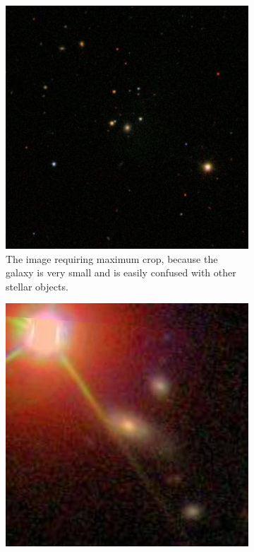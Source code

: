 \documentclass[12pt,a4paper,oneside,oldfontcommands]{memoir}
\begin{document}
\begin{Declaration Of OriginalityOrginality}
\begin{figure}[H]
  \centering
  \begin{subfigure}[b]{0.4\linewidth}
    \includegraphics[width=\linewidth]{images/maximum-256411.jpg}
    \caption{The image requiring maximum crop, because the galaxy is very small and is easily confused with other stellar objects.}
  \end{subfigure}\hspace{1cm}
  \begin{subfigure}[b]{0.4\linewidth}
    \includegraphics[width=\linewidth]{images/minimum-308196.jpg}

\end{subfigure}
\end{figure}
\end{Declaration Of OriginalityOrginality}
\end{document}
